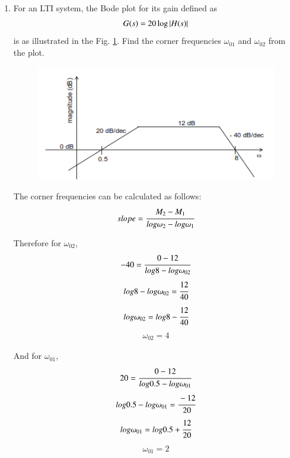 \begin{enumerate}[label=\thesection.\arabic*.,ref=\thesection.\theenumi]

\item For an LTI system, the Bode plot for its gain defined as
\begin{align}
	G(s) = 20\log\abs{H(s)}
	\label{eq:ep18btech11016_gain}
\end{align}
is as illustrated in the Fig. \ref{fig:ep18btech11016_bode}. Find the corner frequencies $\omega_{01}$ and $\omega_{02}$ from the plot.
\begin{figure}[ht!]
\centering
    \includegraphics[width=\columnwidth]{./figs/ep18btech11016_fig1.png}
    \caption{}
    \label{fig:ep18btech11016_bode}
\end{figure}

\solution
The corner frequencies can be calculated as follows:
\begin{align*}
    slope = \cfrac{M_2 - M_1}{log\omega_2 - log\omega_1}\\
\end{align*}

Therefore for $\omega_{02}$,
\begin{align*}
    -40 = \cfrac{0 - 12}{log8 - log\omega_{02}}
\end{align*}
\begin{align*}
    log8 - log\omega_{02} = \cfrac{12}{40}
\end{align*}
\begin{align*}
    log\omega_{02} = log8 - \cfrac{12}{40}
\end{align*}
\begin{align*}
    \omega_{02} = 4
\end{align*}

And for $\omega_{01}$,
\begin{align*}
    20 = \cfrac{0 - 12}{log0.5 - log\omega_{01}}
\end{align*}
\begin{align*}
    log0.5 - log\omega_{01} = \cfrac{-12}{20}
\end{align*}
\begin{align*}
    log\omega_{01} = log0.5 + \cfrac{12}{20}
\end{align*}
\begin{align*}
    \omega_{01} = 2
\end{align*}


\end{enumerate}
